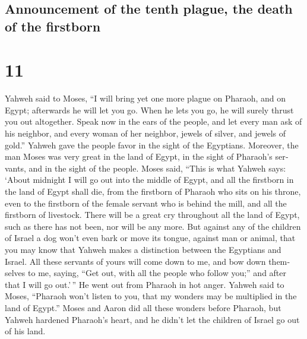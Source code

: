 \begin{paracol}{2}
\switchcolumn
\begin{otherlanguage}{english}

\hypertarget{announcement-of-the-tenth-plague-the-death-of-the-firstborn}{%
\subsection{Announcement of the tenth plague, the death of the
firstborn}\label{announcement-of-the-tenth-plague-the-death-of-the-firstborn}}

\hypertarget{section-21}{%
\section{11}\label{section-21}}

 Yahweh said to Moses, ``I will bring yet one more plague
on Pharaoh, and on Egypt; afterwards he will let you go. When he lets
you go, he will surely thrust you out altogether.  Speak
now in the ears of the people, and let every man ask of his neighbor,
and every woman of her neighbor, jewels of silver, and jewels of gold.''
 Yahweh gave the people favor in the sight of the
Egyptians. Moreover, the man Moses was very great in the land of Egypt,
in the sight of Pharaoh's servants, and in the sight of the people.
 Moses said, ``This is what Yahweh says: `About midnight I
will go out into the middle of Egypt,  and all the
firstborn in the land of Egypt shall die, from the firstborn of Pharaoh
who sits on his throne, even to the firstborn of the female servant who
is behind the mill, and all the firstborn of livestock. 
There will be a great cry throughout all the land of Egypt, such as
there has not been, nor will be any more.  But against any
of the children of Israel a dog won't even bark or move its tongue,
against man or animal, that you may know that Yahweh makes a distinction
between the Egyptians and Israel.  All these servants of
yours will come down to me, and bow down themselves to me, saying, ``Get
out, with all the people who follow you;'' and after that I will go
out.'\,'' He went out from Pharaoh in hot anger.  Yahweh
said to Moses, ``Pharaoh won't listen to you, that my wonders may be
multiplied in the land of Egypt.''  Moses and Aaron did
all these wonders before Pharaoh, but Yahweh hardened Pharaoh's heart,
and he didn't let the children of Israel go out of his land.

\end{otherlanguage}


\end{paracol}
